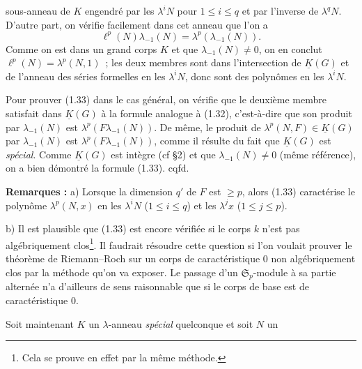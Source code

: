 sous-anneau de $K$ engendré par les $\lambda^iN$ pour $1\leq i\leq q$ et par l'inverse de $\lambda^qN$. D'autre part, on vérifie facilement dans cet anneau que l'on a
\[
\ell^p(N)\lambda_{-1}(N)=\lambda^p(\lambda_{-1}(N)).
\]
Comme on est dans un grand corps $K$ et que $\lambda_{-1}(N)\neq0$, on en conclut $\ell^p(N)=\lambda^p(N,1)$~; les deux membres sont dans l'intersection de $\underline{K}(G)$ et de l'anneau des séries formelles en les $\lambda^iN$, donc sont des polynômes en les $\lambda^iN$.

Pour prouver (1.33) dans le cas général, on vérifie que le deuxième membre satisfait dans $\underline{K}(G)$ à la formule analogue à (1.32), c'est-à-dire que son produit par $\lambda_{-1}(N)$ est $\lambda^p(F\lambda_{-1}(N))$. De même, le produit de $\lambda^p(N,F)\in \underline{K}(G)$ par $\lambda_{-1}(N)$ est $\lambda^p(F\lambda_{-1}(N))$, comme il résulte du fait que $\underline{K}(G)$ est \emph{spécial}. Comme $\underline{K}(G)$ est intègre (cf \S 2) et que $\lambda_{-1}(N)\neq0$ (même référence), on a bien démontré la formule (1.33). cqfd.

\textbf{Remarques :} a) Lorsque la dimension $q'$ de $F$ est $\geq p$, alors (1.33) caractérise le polynôme $\lambda^p(N,x)$ en les $\lambda^iN$ ($1\leq i\leq q$) et les $\lambda^jx$ ($1\leq j\leq p$).

b) Il est plausible que (1.33) est encore vérifiée si le corps $k$ n'est pas algébriquement clos\footnote{Cela se prouve en effet par la même méthode.}. Il faudrait résoudre cette question si l'on voulait prouver le théorème de Riemann--Roch sur un corps de caractéristique $0$ non algébriquement clos par la méthode qu'on va exposer. Le passage d'un $\mathfrak S_p$-module à sa partie alternée n'a d'ailleurs de sens raisonnable que si le corps de base est de caractéristique $0$.

Soit maintenant $K$ un $\lambda$-anneau \emph{spécial} quelconque et soit $N$ un

